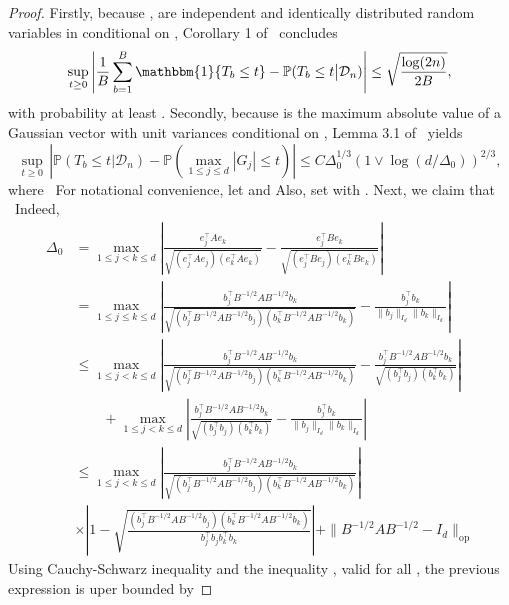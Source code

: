 \documentclass{article}
\begin{document}
\begin{appendices}
\begin{proof}
Firstly, because  , are independent and identically distributed random variables in   conditional on  , Corollary 1 of~\cite{massart1990tight} concludes
\begin{equation}\label{eq:Average-to-conditional-probability}
\sup_{t\ge 0}\left|\frac{1}{B}\sum_{b=1}^B\mathbbm{1}\{T_b \le t\} - \mathbb{P}(T_b \le t\big|\mathcal{D}_n)\right| \le \sqrt{\frac{\log(2n)}{2B}},
\end{equation}
with probability at least  .
Secondly, because   is the maximum absolute value of a Gaussian vector with unit variances conditional on  , Lemma 3.1 of~\cite{Cher13} yields
\begin{equation}\label{eq:Gaussian-comparison-bound}
\sup_{t\ge 0}\,\left|\mathbb{P}(T_b \le t\big|\mathcal{D}_n) - \mathbb{P}\left(\max_{1\le j\le d}|G_j| \le t\right)\right| \le C\Delta_0^{1/3}(1\vee \log(d/\Delta_0))^{2/3},
\end{equation}
where
\ For notational convenience, let
  and  
Also, set   with  .
Next, we claim that
\ Indeed,
\begin{align*}
\Delta_0
&= \max_{1\le j < k\le d}\left|\frac{e_j^{\top}Ae_k}{\sqrt{(e_j^{\top}Ae_j)(e_k^{\top}Ae_k)}} - \frac{e_j^{\top}Be_k}{\sqrt{(e_j^{\top}Be_j)(e_k^{\top}Be_k)}}\right|\\ &= \max_{1\le j\le k \le d}\left|\frac{b_j^{\top}B^{-1/2}AB^{-1/2}b_k}{\sqrt{(b_j^{\top}B^{-1/2}AB^{-1/2}b_j)(b_k^{\top}B^{-1/2}AB^{-1/2}b_k)}} - \frac{b_j^{\top}b_k}{\|b_j\|_{I_d}\|b_k\|_{I_d}}\right|\\ &\le \max_{1\le j < k\le d}\left|\frac{b_j^{\top}B^{-1/2}AB^{-1/2}b_k}{\sqrt{(b_j^{\top}B^{-1/2}AB^{-1/2}b_j)(b_k^{\top}B^{-1/2}AB^{-1/2}b_k)}} - \frac{b_j^{\top}B^{-1/2}AB^{-1/2}b_k}{\sqrt{(b_j^{\top}b_j)(b_k^{\top}b_k)}}\right|\\ &\qquad+ \max_{1\le j < k\le d}\left|\frac{b_j^{\top}B^{-1/2}AB^{-1/2}b_k}{\sqrt{(b_j^{\top}b_j)(b_k^{\top}b_k)}} - \frac{b_j^{\top}b_k}{\|b_j\|_{I_d}\|b_k\|_{I_d}}\right|\\ &\le \max_{1\le j < k\le d}\left|\frac{b_j^{\top}B^{-1/2}AB^{-1/2}b_k}{\sqrt{(b_j^{\top}B^{-1/2}AB^{-1/2}b_j)(b_k^{\top}B^{-1/2}AB^{-1/2}b_k)}}\right|\\ & \times\left|1 - \sqrt{\frac{(b_j^{\top}B^{-1/2}AB^{-1/2}b_j)(b_k^{\top}B^{-1/2}AB^{-1/2}b_k)}{b_j^{\top}b_jb_k^{\top}b_k}}\right|+ \|B^{-1/2}AB^{-1/2} - I_d\|_{\mathrm{op}}
\end{align*}
Using Cauchy-Schwarz inequality and the inequality  , valid for all  , the previous expression is uper bounded by

\end{proof}
\end{appendices}
\end{document}
